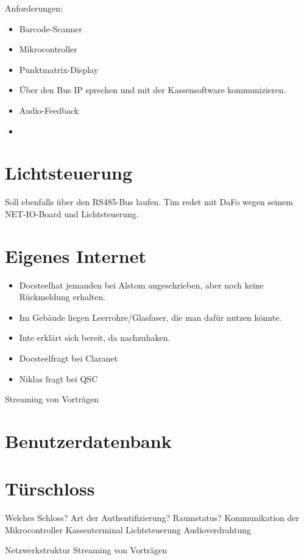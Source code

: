 \documentclass{scrartcl}
\newcommand\docsteel{Docsteel}
\newcommand\uc{Mikrocontroller}
\begin{document}
Anforderungen:
\begin{itemize}
\item{} Barcode-Scanner
\item{} \uc
\item{} Punktmatrix-Display
\item{} Über den Bus IP sprechen und mit der Kassensoftware kommunizieren.
\item{} Audio-Feedback
\item{}
\end{itemize}

\section{Lichtsteuerung}

Soll ebenfalls über den RS485-Bus laufen.
Tim redet mit DaFo wegen seinem NET-IO-Board und Lichtsteuerung.

\section{Eigenes Internet}

\begin{itemize}
\item{} \docsteel hat jemanden bei Alstom angeschrieben, aber noch keine Rückmeldung erhalten.
\item{} Im Gebäude liegen Leerrohre/Glasfaser, die man dafür nutzen könnte.
\item{} Inte erklärt sich bereit, da nachzuhaken.
\item{} \docsteel fragt bei Claranet
\item{} Niklas fragt bei QSC
\end{itemize}


Streaming von Vorträgen

\section{Benutzerdatenbank}

\section{Türschloss}

Welches Schloss?
Art der Authentifizierung?
Raumstatus?
Kommunikation der Mikrocontroller
Kassenterminal
Lichtsteuerung
Audioverdrahtung

Netzwerkstruktur
Streaming von Vorträgen
\end{document}
